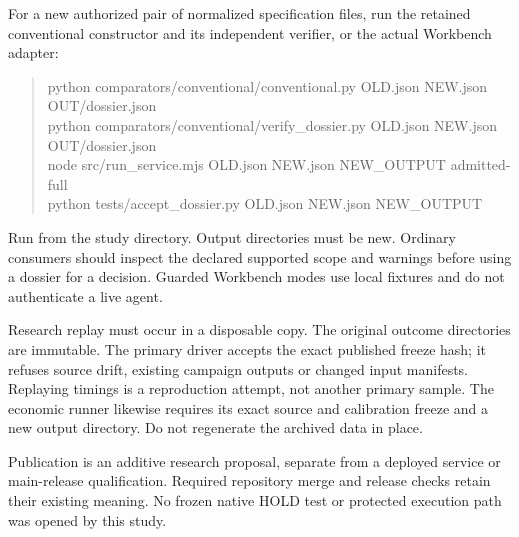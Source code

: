 For a new authorized pair of normalized specification files, run the retained conventional
constructor and its independent verifier, or the actual Workbench adapter:

\begin{quote}\footnotesize\ttfamily
python comparators/conventional/conventional.py OLD.json NEW.json OUT/dossier.json\\
python comparators/conventional/verify\_dossier.py OLD.json NEW.json OUT/dossier.json\\[3pt]
node src/run\_service.mjs OLD.json NEW.json NEW\_OUTPUT admitted-full\\
python tests/accept\_dossier.py OLD.json NEW.json NEW\_OUTPUT
\end{quote}

Run from the study directory. Output directories must be new. Ordinary consumers should inspect
the declared supported scope and warnings before using a dossier for a decision. Guarded
Workbench modes use local fixtures and do not authenticate a live agent.

Research replay must occur in a disposable copy. The original outcome directories are immutable.
The primary driver accepts the exact published freeze hash; it refuses source drift, existing
campaign outputs or changed input manifests. Replaying timings is a reproduction attempt, not
another primary sample. The economic runner likewise requires its exact source and calibration
freeze and a new output directory. Do not regenerate the archived data in place.

Publication is an additive research proposal, separate from a deployed service or main-release
qualification. Required repository merge and release checks retain their existing meaning.
No frozen native HOLD test or protected execution path was opened by this study.
